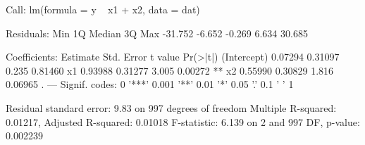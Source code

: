 \begin{Schunk}
\begin{Soutput}
Call:
lm(formula = y ~ x1 + x2, data = dat)

Residuals:
    Min      1Q  Median      3Q     Max 
-31.752  -6.652  -0.269   6.634  30.685 

Coefficients:
            Estimate Std. Error t value Pr(>|t|)   
(Intercept)  0.07294    0.31097   0.235  0.81460   
x1           0.93988    0.31277   3.005  0.00272 **
x2           0.55990    0.30829   1.816  0.06965 . 
---
Signif. codes:  0 '***' 0.001 '**' 0.01 '*' 0.05 '.' 0.1 ' ' 1

Residual standard error: 9.83 on 997 degrees of freedom
Multiple R-squared:  0.01217,	Adjusted R-squared:  0.01018 
F-statistic: 6.139 on 2 and 997 DF,  p-value: 0.002239
\end{Soutput}
\end{Schunk}
